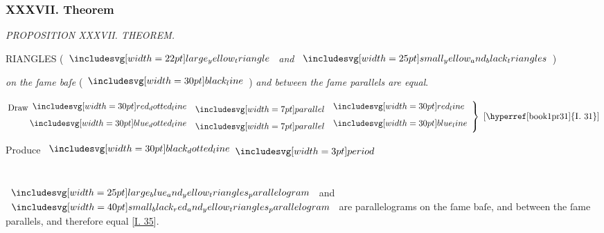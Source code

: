 \documentclass[11pt,preview]{standalone}
\begin{document}
\subsubsection{XXXVII. Theorem}

\begin{minipage}[t]{0.43\textwidth}
    \vspace{24pt}
    
\end{minipage}%
\hfill
\begin{minipage}[t]{0.54\textwidth}
    \begin{center}
        \textit{PROPOSITION XXXVII. THEOREM.}\label{book1pr37} \\
    \end{center}

    \hfill

    \begin{center}
        \raggedright \lettrine[lines=3, loversize=1, nindent=0pt]{}{}RIANGLES (\hspace{-1ex}$\img[0][0][22]{large_yellow_triangle}$ \textit{and} $\img{small_yellow_and_black_triangles}$\hspace{-1ex})
    \end{center}
    \textit{on the ſame baſe} (\hspace{-1ex}$\blackline$\hspace{-1ex}) \textit{and between the ſame parallels are equal}.
\end{minipage}

\hfill

{\vspace{1ex}\begin{center}
        $\left.\begin{aligned}\text{Draw}\dottedredline & \bparallel \redline \\ \dottedblueline & \bparallel \blueline \end{aligned}\right\}\text{ [\hyperref[book1pr31]{\textsc{I.} 31}]}$
    \end{center}}

\begin{center}
    Produce $\dottedblackline \bperiod$\\
    \hfill\\
    \hfill\\
    $\img{large_blue_and_yellow_triangles_parallelogram}$ and $\img[0][0][40]{small_black_red_and_yellow_triangles_parallelogram}$ are parallelograms on the ſame baſe, and between the ſame parallels, and therefore equal [\hyperref[book1pr35]{\textsc{I.} 35}].
\end{center}
\end{document}
